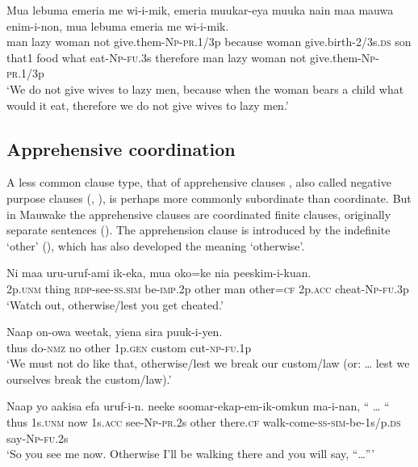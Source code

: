 \ea%
\label{ex:x1423}
\gll Mua  lebuma  emeria  me  wi-i-mik,    emeria  muukar-eya  muuka  nain  maa  mauwa  enim-i-non,   mua  lebuma  emeria  me  wi-i-mik.\\
man  lazy  woman  not  give.them-\textsc{Np}-\textsc{pr}.1/3p because  woman give.birth-2/3s.\textsc{ds} son  that1  food  what  eat-\textsc{Np}-\textsc{fu}.3s therefore  man  lazy  woman  not  give.them-\textsc{Np}-\textsc{pr}.1/3p\\
\glt`We do not give wives to lazy men, because when the woman bears a child what would it eat, therefore we do not give wives to lazy men.'
\z


\subsection{Apprehensive coordination}

A less common clause type, that of apprehensive clauses \citep[61]{Roberts1987}, also called negative purpose clauses (\citealt[444]{Haiman1980}, \citealt[188]{ThompsonEtAl1985}), is perhaps more commonly subordinate than coordinate. But in Mauwake the apprehensive clauses are coordinated finite clauses, originally separate sentences (). The apprehension clause is introduced by the indefinite  `other' (), which has also developed the meaning `otherwise'.  

\ea%
\label{ex:x1426}
\gll Ni  maa  uru-uruf-ami  ik-eka,    mua  oko=ke nia  peeskim-i-kuan.\\
2p.\textsc{unm} thing \textsc{rdp}-see-\textsc{ss}.\textsc{sim}  be-\textsc{imp}.2p  other  man  other=\textsc{cf} 2p.\textsc{acc}  cheat-\textsc{Np}-\textsc{fu}.3p\\
\glt`Watch out, otherwise/lest you get cheated.'
\z


\ea%
\label{ex:x1427}
\gll Naap  on-owa  weetak,   yiena  sira  puuk-i-yen. \\
thus  do-\textsc{nmz} no other 1p.\textsc{gen} custom  cut-\textsc{np}-\textsc{fu}.1p\\
\glt`We must not do like that, otherwise/lest we break our custom/law (or: {\dots} lest we ourselves break the custom/law).'
\z


\ea%
\label{ex:x1428}
\gll Naap  yo  aakisa  efa  uruf-i-n.   neeke soomar-ekap-em-ik-omkun  ma-i-nan,  ``  {\dots } ``\\
thus  1s.\textsc{unm} now 1s.\textsc{acc} see-\textsc{Np}-\textsc{pr}.2s other there.\textsc{cf} walk-come-\textsc{ss}-\textsc{sim}-be-1s/p.\textsc{ds} say-\textsc{Np}-\textsc{fu}.2s\\
\glt`So you see me now. Otherwise I'll be walking there and you will say, ``{\dots}'''
\z
{}


